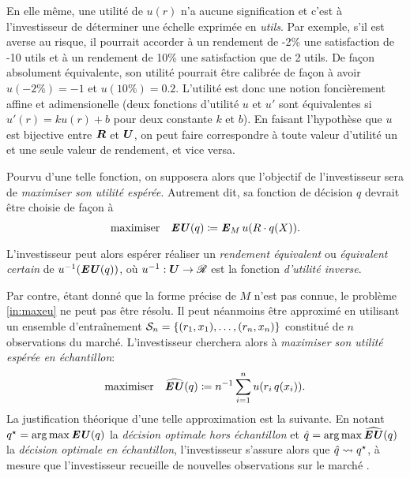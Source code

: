 En elle même, une utilité de $u(r)$ n'a aucune signification et c'est à l'investisseur de
déterminer une échelle exprimée en \textit{utils}. Par exemple, s'il est averse au risque,
il pourrait accorder à un rendement de -2\% une satisfaction de -10 utils et à un
rendement de 10\% une satisfaction que de 2 utils. De façon absolument équivalente, son
utilité pourrait être calibrée de façon à avoir $u(-2\%) = -1$ et $u(10\%) =
0.2$. L'utilité est donc une notion foncièrement affine et adimensionelle (deux fonctions
d'utilité $u$ et $u'$ sont équivalentes si $u'(r) = ku(r) + b$ pour deux constante $k$ et
$b$). En faisant l'hypothèse que $u$ est bijective entre $\R$ et $\Ut$, on peut faire
correspondre à toute valeur d'utilité un et une seule valeur de rendement, et vice versa.

Pourvu d'une telle fonction, on supposera alors que l'objectif de l'investisseur sera de
\textit{maximiser son utilité espérée}. Autrement dit, sa fonction de décision $q$ devrait
être choisie de façon à
\begin{equation}
  \label{in:maxeu}
  \maximizeEquation{\EU(q) \coloneq \E_M u(R\cdot q(X)).}
\end{equation}
L'investisseur peut alors espérer réaliser un \textit{rendement équivalent} ou
\textit{équivalent certain} de $u^{-1}(\EU(q))$, où $u^{-1}:\Ut \to \Re$ est la fonction
\textit{d'utilité inverse}.

Par contre, étant donné que la forme précise de $M$ n'est pas connue, le problème
\eqref{in:maxeu} ne peut pas être résolu. Il peut néanmoins être approximé en utilisant un
ensemble d'entraînement $\S_n = \{(r_1,x_1),\ldots,(r_n,x_n)\}$ constitué de $n$
observations du marché. L'investisseur cherchera alors à \textit{maximiser son utilité
  espérée en échantillon}:
\begin{equation}
  \maximizeEquation{\hEU(q) \coloneqq n^{-1} \sumi u(r_i\,q(x_i)).}
\end{equation}
La justification théorique d'une telle approximation est la suivante. En notant
$q^\star = \argmax\EU(q)$ la \textit{décision optimale hors échantillon} et
$\qh = \argmax\hEU(q)$ la \textit{décision optimale en échantillon}, l'investisseur
s'assure alors que $\qh \leadsto q^\star$, à mesure que l'investisseur recueille de nouvelles
observations sur le marché \cite{shapiro2009lectures}.


